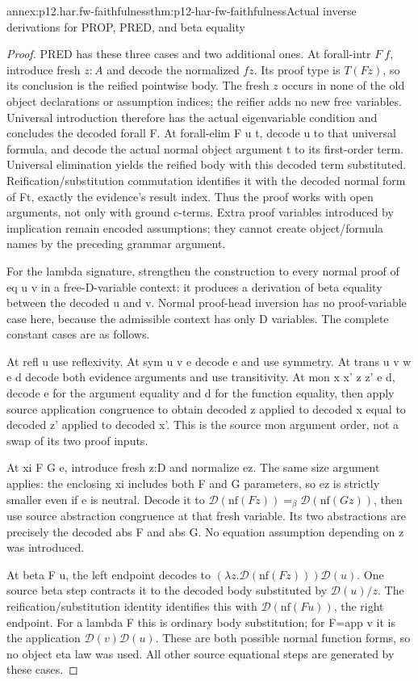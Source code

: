 \begin{annexitem}{annex:p12.har.fw-faithfulness}{thm:p12-har-fw-faithfulness}{Actual inverse derivations for PROP, PRED, and beta equality}
\begin{proof}
PRED has these three cases and two additional ones. At forall-intr \(F\ f\),
introduce fresh \(z:A\) and decode the normalized \(fz\). Its proof type is
\(T(Fz)\), so its conclusion is the reified pointwise body. The fresh \(z\)
occurs in none of the old object declarations or assumption indices;
the reifier adds no new free variables. Universal introduction therefore
has the actual eigenvariable condition and concludes the decoded
forall F. At forall-elim F u t, decode u to that universal formula,
and decode the actual normal object argument t to its first-order term.
Universal elimination yields the reified body with this decoded term
substituted. Reification/substitution commutation identifies it with
the decoded normal form of Ft, exactly the evidence's result index.
Thus the proof works with open arguments, not only with ground c-terms.
Extra proof variables introduced by implication remain encoded assumptions;
they cannot create object/formula names by the preceding grammar argument.

For the lambda signature, strengthen the construction to every normal
proof of eq u v in a free-D-variable context: it produces a derivation
of beta equality between the decoded u and v. Normal proof-head inversion
has no proof-variable case here, because the admissible context has only
D variables. The complete constant cases are as follows.

At refl u use reflexivity. At sym u v e decode e and use symmetry.
At trans u v w e d decode both evidence arguments and use transitivity.
At mon x x' z z' e d, decode e for the argument equality and d for
the function equality, then apply source application congruence to
obtain decoded z applied to decoded x equal to decoded z' applied
to decoded x'. This is the source mon argument order, not a swap of
its two proof inputs.

At xi F G e, introduce fresh z:D and normalize ez. The same size
argument applies: the enclosing xi includes both F and G parameters,
so ez is strictly smaller even if e is neutral. Decode it to
\(\mathcal D(\mathrm{nf}(Fz))=_\beta
\mathcal D(\mathrm{nf}(Gz))\), then use source abstraction congruence
at that fresh variable. Its two abstractions are precisely the decoded
abs F and abs G. No equation assumption depending on z was introduced.

At beta F u, the left endpoint decodes to
\((\lambda z.\mathcal D(\mathrm{nf}(Fz)))\mathcal D(u)\).
One source beta step contracts it to the decoded body substituted by
\(\mathcal D(u)/z\). The reification/substitution identity identifies
this with \(\mathcal D(\mathrm{nf}(Fu))\), the right endpoint.
For a lambda F this is ordinary body substitution; for F=app v it
is the application \(\mathcal D(v)\mathcal D(u)\). These are
both possible normal function forms, so no object eta law was used.
All other source equational steps are generated by these cases.


\end{proof}
\end{annexitem}
